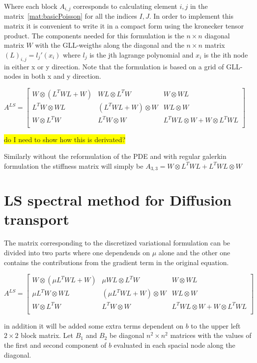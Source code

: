 Where each block $A_{i,j}$ corresponds to  calculating element $i,j$ in the matrix~\ref{mat:basicPoisson} for all the indices $I,J$. In order to implement this matrix it is convenient to write it in a compact form using the kronecker tensor product. The components needed for this formulation is the $n \times n$ diagonal matrix $ W $ with the GLL-weigths along the diagonal and the $n \times n$ matrix $(L)_{i,j}= l_j'(x_i)$ where $l_j$ is the jth lagrange polynomial and $x_i$ is the ith node in either x or y direction. Note that the formulation is based on a grid of GLL-nodes in both x and y direction. 

$
A^{LS} = 
\begin{bmatrix}
	W \otimes (L^TWL+W) & WL \otimes L^TW 		 &	W \otimes WL  \\ 	
	L^TW \otimes WL     & (L^TWL+W) \otimes W  &	WL \otimes W  \\ 	
	W \otimes L^TW		  & L^TW \otimes W       &  L^TWL \otimes W +	W\otimes L^TWL  \\ 	
\end{bmatrix}
$

\colorbox{yellow}{do I need to show how this is derivated?}

Similarly without the reformulation of the PDE and with regular galerkin formulation the stiffness matrix will simply be 
$A_{3,3} = W \otimes L^TWL+ L^TWL \otimes W$
\section{LS spectral method for Diffusion transport}
The matrix corresponding to the discretized variational formulation can be divided into two parts where one dependends on $\mu$ alone and the other one contains the contributions from the gradient term in the original equation. 

$
A^{LS} = 
\begin{bmatrix}
	W \otimes (\mu L^TWL+W) & \mu WL \otimes L^TW 		 &	W \otimes WL  \\ 	
	\mu L^TW \otimes WL     & (\mu L^TWL+W) \otimes W  &	WL \otimes W  \\ 	
	W \otimes L^TW		  & L^TW \otimes W       &  L^TWL \otimes W +	W\otimes L^TWL  \\ 	
\end{bmatrix}
$

in addition it will be added some extra terms dependent on $b$ to the upper left $2 \times 2$ block matrix. Let $B_1$ and $B_2$ be diagonal $n^2 \times n^2$ matrices with the values of the first and second component of $b$ evaluated in each spacial node along the diagonal.  

